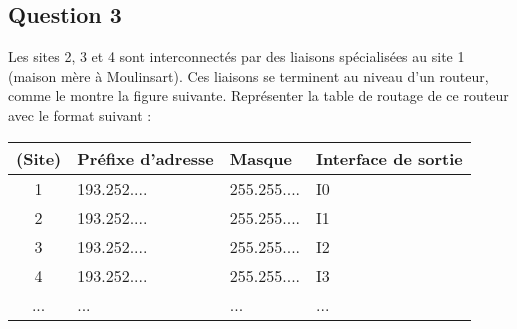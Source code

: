 \documentclass{article}
\begin{document}
\subsection*{Question 3}
\begin{exercise}
    Les sites 2, 3 et 4 sont interconnectés par des liaisons spécialisées au site 1 (maison mère à Moulinsart). Ces liaisons se terminent au niveau d'un routeur, comme le montre la figure suivante. Représenter la table de routage de ce routeur avec le format suivant :
    \begin{table}[H]
        \centering\begin{tabular}{clll}
            (Site) & Préfixe d'adresse & Masque & Interface de sortie\\
            \hline
            1 & 193.252.... & 255.255.... & I0\\
            2 & 193.252.... & 255.255.... & I1\\
            3 & 193.252.... & 255.255.... & I2\\
            4 & 193.252.... & 255.255.... & I3\\
            ... & ... & ... & ...\\
            \hline
        \end{tabular}
    \end{table}
\end{exercise}
\begin{resolution}

\end{resolution}
\end{document}
